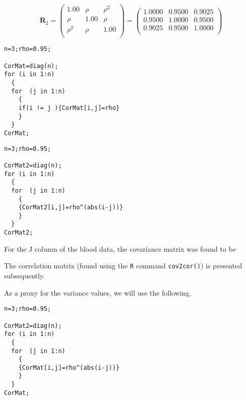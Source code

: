 \documentclass[a4paper,12pt]{article}
\begin{document}
\[ \boldsymbol{R}_2 = \left(\begin{array}{ccc}
1.00 & \rho & \rho^2 \\
\rho & 1.00 & \rho \\
\rho^2 & \rho & 1.00\\
\end{array} \right)
=
\left(\begin{array}{ccc}
1.0000 & 0.9500 & 0.9025 \\
0.9500 & 1.0000 & 0.9500 \\
0.9025 & 0.9500 & 1.0000 \\
\end{array} \right)\]



\begin{framed}
\begin{verbatim}
n=3;rho=0.95;

CorMat=diag(n);
for (i in 1:n)
  {
  for  (j in 1:n)
    {
    if(i != j ){CorMat[i,j]=rho}
    }
  }
CorMat;
\end{verbatim}
\end{framed}



\begin{framed}
\begin{verbatim}
n=3;rho=0.95;

CorMat2=diag(n);
for (i in 1:n)
  {
  for  (j in 1:n)
    {
    {CorMat2[i,j]=rho^(abs(i-j))}
    }
  }
CorMat2;
\end{verbatim}
\end{framed}


For the J column of the blood data, the covariance matrix was found to be

The correlation matrix (found using the \texttt{R} command \texttt{cov2cor()}) is presented subsequently.


As a proxy for the variance values, we will use the following.

\begin{framed}
\begin{verbatim}
n=3;rho=0.95;

CorMat2=diag(n);
for (i in 1:n)
  {
  for  (j in 1:n)
    {
    {CorMat[i,j]=rho^(abs(i-j))}
    }
  }
CorMat;
\end{verbatim}
\end{framed}
\end{document}
